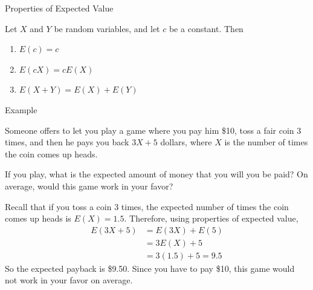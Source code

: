 \documentclass[xcolor=table]{beamer}
\begin{document}
\begin{frame}{Properties of Expected Value}
\begin{block}{}
Let $X$ and $Y$ be random variables, and let $c$ be a constant. Then
\begin{enumerate}
\item $E(c) = c$
\item $E(cX) = cE(X)$
\item $E(X+Y) = E(X)+E(Y)$
\end{enumerate}
\end{block}

\end{frame}

\begin{frame}{Example}
\begin{block}{}
Someone offers to let you play a game where you pay him \$10, toss a fair coin 3 times, and then he pays you back $3X+5$ dollars, where $X$ is the number of times the coin comes up heads.

\vspace{.3cm}
If you play, what is the expected amount of money that you will you be paid? On average, would this game work in your favor?
\end{block}

\pause
\vspace{.3cm}
Recall that if you toss a coin 3 times, the expected number of times the coin comes up heads is $E(X)=1.5$. \pause Therefore, using properties of expected value,
\begin{align*}
E(3X+5) &= E(3X)+E(5) \\
&= 3E(X)+5  \\
&= 3(1.5) + 5 = 9.5
\end{align*}
\pause So the expected payback is \$9.50. Since you have to pay \$10, this game would not work in your favor on average.
\end{frame}
\end{document}
